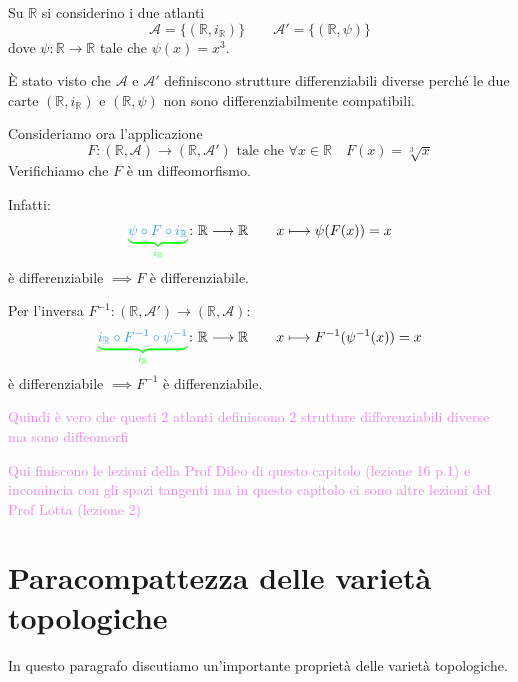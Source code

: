         \newpage
        \begin{esempio}[\textcolor{violet}{2 atlanti con strutture diverse ma diffeomorfi}]
        \mbox{}

        Su $\mathbb{R}$ si considerino i due atlanti
        \[
        \mathcal{A} = \{(\mathbb{R}, i_{\mathbb{R}})\} \qquad \mathcal{A}' = \{(\mathbb{R}, \psi)\}
        \]
        dove $\psi \colon \mathbb{R} \to \mathbb{R}$ tale che $\psi(x) = x^3$.

        È stato visto che $\mathcal{A}$ e $\mathcal{A}'$ definiscono strutture differenziabili diverse perché le due 
        carte $(\mathbb{R}, i_{\mathbb{R}})$ e $(\mathbb{R}, \psi)$ non sono differenziabilmente compatibili.

        Consideriamo ora l'applicazione
        \[
        F \colon (\mathbb{R}, \mathcal{A}) \longrightarrow (\mathbb{R}, \mathcal{A}')  \text{  tale che  } \forall x \in \mathbb{R} \quad F(x) = \sqrt[3]{x}
        \]
        Verifichiamo che $F$ è un diffeomorfismo.

        Infatti:
        \[
        \textcolor{green}{\underbrace{\textcolor{celeste}{\psi \circ F \circ i_{\mathbb{R}}}}_{i_{\mathbb{R}}}} \colon \mathbb{R} \longrightarrow \mathbb{R} \qquad x \longmapsto \psi(F(x)) = x
        \]
        è differenziabile $\implies F$ è differenziabile.

        Per l'inversa $F^{-1} \colon (\mathbb{R}, \mathcal{A}') \longrightarrow (\mathbb{R}, \mathcal{A})$:
        \[
        \textcolor{green}{\underbrace{\textcolor{celeste}{i_{\mathbb{R}} \circ F^{-1} \circ \psi^{-1}}}_{i_{\mathbb{R}}}}  \colon \mathbb{R} \longrightarrow \mathbb{R} \qquad x \longmapsto F^{-1}(\psi^{-1}(x)) = x
        \]
        è differenziabile $\implies F^{-1}$ è differenziabile.

        \textcolor{violet}{Quindi è vero che questi $2$ atlanti definiscono $2$ strutture differenziabili diverse ma sono diffeomorfi}
        \end{esempio}
        \textcolor{violet}{Qui finiscono le lezioni della Prof Dileo di questo capitolo (lezione 16 p.1) e incomincia con gli spazi tangenti ma in questo capitolo
        ci sono altre lezioni del Prof Lotta (lezione 2)}
    \section{Paracompattezza delle varietà topologiche}
        In questo paragrafo discutiamo un'importante proprietà delle varietà topologiche.
        
